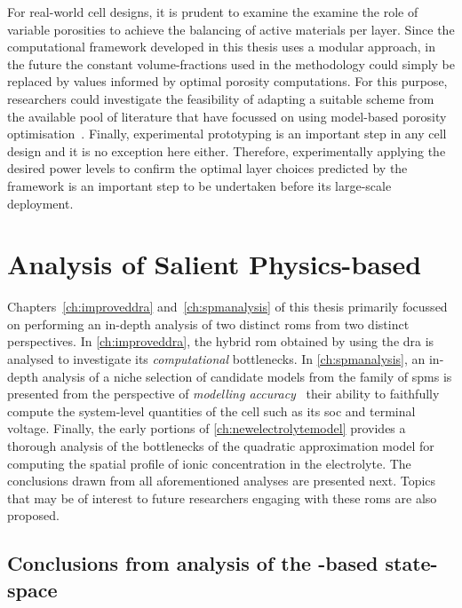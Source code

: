For  real-world cell  designs, it  is prudent  to examine  the examine  the role
of  variable  porosities  to  achieve  the balancing  of  active  materials  per
layer.  Since  the computational  framework  developed  in  this thesis  uses  a
modular  approach, in  the  future  the constant  volume-fractions  used in  the
methodology  could simply  be replaced  by values  informed by  optimal porosity
computations. For this purpose, researchers could investigate the feasibility of
adapting  a suitable  scheme from  the available  pool of  literature that  have
focussed  on  using  model-based  porosity  optimisation~\cite{Xue2013,Xue2014,
Christensen2006}. Finally, experimental prototyping is  an important step in any
cell  design and  it  is  no exception  here  either. Therefore,  experimentally
applying the desired power levels to confirm the optimal layer choices predicted
by the  framework is an important  step to be undertaken  before its large-scale
deployment.


\section{Analysis of Salient Physics-based }

Chapters~\ref{ch:improveddra} and~\ref{ch:spmanalysis} of  this thesis primarily
focussed on performing an in-depth analysis of two distinct \glspl{rom} from two
distinct perspectives.  In \cref{ch:improveddra}, the hybrid  \gls{rom} obtained
by  using the  \gls{dra}  is analysed  to  investigate its  \emph{computational}
bottlenecks. In \cref{ch:spmanalysis}, an in-depth analysis of a niche selection
of  candidate models  from  the  family of  \glspl{spm}  is  presented from  the
perspective of \emph{modelling accuracy} \ie~their ability to faithfully compute
the  system-level quantities  of the  cell such  as its  \gls{soc} and  terminal
voltage. Finally, the early portions of \cref{ch:newelectrolytemodel} provides a
thorough analysis  of the bottlenecks  of the quadratic approximation  model for
computing the  spatial profile  of ionic concentration  in the  electrolyte. The
conclusions drawn  from all aforementioned  analyses are presented  next. Topics
that may  be of interest to  future researchers engaging with  these \glspl{rom}
are also proposed.

\subsection{Conclusions from analysis of the -based state-space }

